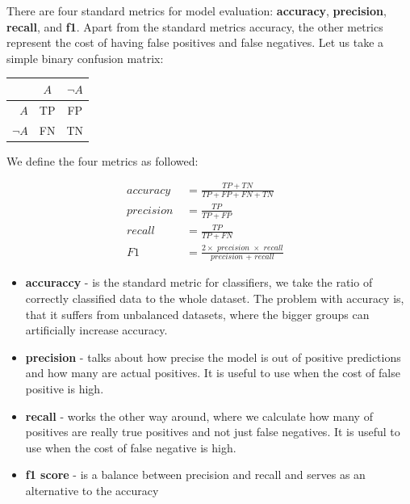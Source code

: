 There are four standard metrics \cite{nn-metrics} for model evaluation: \textbf{accuracy}, \textbf{precision}, \textbf{recall}, and \textbf{f1}. Apart from the standard metrics accuracy, the other metrics represent the cost of having false positives and false negatives. Let us take a simple binary confusion matrix:

\begin{table}[h]
\centering
\begin{tabular}{|r|c c|}

\hline 
& $A$ & $\neg A$ \\
\hline 
$A$ & TP & FP \\
$\neg A$ & FN & TN\footnotemark\\

\hline

\end{tabular}

\end{table}


\noindent
We define the four metrics as followed:

\begin{align*}
\textit{accuracy } & = \frac{TP + TN}{TP + FP + FN + TN} & \\
\textit{precision } & = \frac{TP}{TP + FP} & \\
\textit{recall } & = \frac{TP}{TP + FN} & \\
\textit{F1 } & = \frac{2 \times \textit{ precision } \times \textit{ recall}}{\textit{precision } + \textit{ recall}} &
\end{align*}

\begin{itemize}

\item \textbf{accuraccy} - is the standard metric for classifiers, we take the ratio of correctly classified data to the whole dataset. The problem with accuracy is, that it suffers from unbalanced datasets, where the bigger groups can artificially increase accuracy.

\item \textbf{precision} - talks about how precise the model is out of positive predictions and how many are actual positives. It is useful to use when the cost of false positive is high.

\item \textbf{recall} - works the other way around, where we calculate how many of positives are really true positives and not just false negatives. It is useful to use when the cost of false negative is high.

\item \textbf{f1 score} - is a balance between precision and recall and serves as an alternative to the accuracy

\end{itemize}

